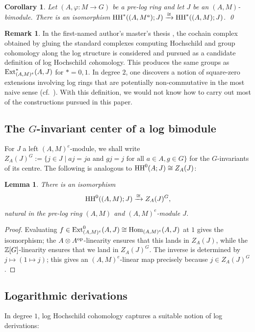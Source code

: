 \documentclass[a4paper,10pt%
]{amsart}
\numberwithin{equation}{section}
\newtheorem{corollary}[subsection]{Corollary}
\newtheorem{lemma}[subsection]{Lemma}
\theoremstyle{definition}
\newtheorem{remark}[subsection]{Remark}
\renewcommand{\:}{\colon}
\begin{document}
\begin{corollary} Let $(A, \varphi \colon M \to G)$ be a pre-log ring and let $J$ be an $(A, M)$-bimodule. There is an isomorphism ${\rm HH}^*((A, M^a) ; J) \xrightarrow{\cong} {\rm HH}^*((A, M) ; J)$. \qed
\end{corollary}

\begin{remark} In the first-named author's master's thesis \cite{vdH26}, the cochain complex obtained by gluing the standard complexes computing Hochschild and group cohomology along the log structure is considered and pursued as a candidate definition of log Hochschild \emph{co}homology. This produces the same groups as ${\rm Ext}^*_{(A, M)^e}(A, J)$ for $* = 0, 1$. In degree $2$, one discovers a notion of square-zero extensions involving log rings that are potentially non-commutative in the most naive sense (cf.\ \cite[Definition 5.10, Remark 5.12]{Rog09}). With this definition, we would not know how to carry out most of the constructions pursued in this paper. 
\end{remark}

\subsection{The $G$-invariant center of a log bimodule} For $J$ a left $(A, M)^e$-module, we shall write $Z_A(J)^G := \{j \in J \mid aj = ja \text{ and } gj = j \text{ for all } a \in A, g \in G\}$ for the $G$-invariants of its centre. The following is analogous to ${\rm HH}^0(A ; J) \cong Z_A(J)$:

\begin{lemma}\label{lem:loghhzero} There is an isomorphism \[{\rm HH}^0((A, M); J) \xrightarrow{\cong} Z_A(J)^G,\] natural in the pre-log ring $(A, M)$ and $(A, M)^e$-module $J$. 
\end{lemma}

\begin{proof} Evaluating $f \in {\rm Ext}^0_{(A, M)^e}(A, J) \cong {\rm Hom}_{(A, M)^e}(A, J)$ at $1$ gives the isomorphism; the $A \otimes A^{\rm op}$-linearity ensures that this lands in $Z_A(J)$, while the ${\Bbb Z}[G]$-linearity ensures that we land in $Z_A(J)^G$. The inverse is determined by $j \mapsto (1 \mapsto j)$; this gives an $(A, M)^e$-linear map precisely because $j \in Z_A(J)^G$.
\end{proof}

\subsection{Logarithmic derivations} In degree $1$, log Hochschild cohomology captures a suitable notion of log derivations: 
\end{document}
